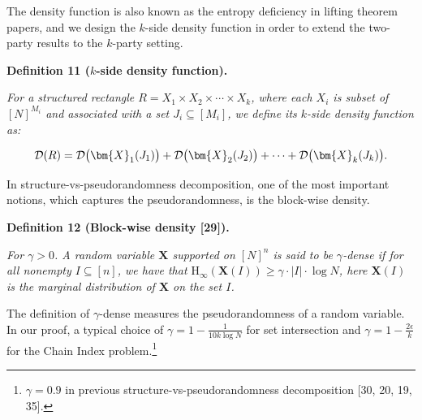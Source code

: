 The density function is also known as the entropy deficiency in lifting theorem papers, and we design the $k$-side density function in order to extend the two-party results to the $k$-party setting.\par





\par\medskip\noindent\textbf{
\textbf{Definition 11}\textbf{ }($k$-side density function)\textbf{.}
}\par



\emph{For a structured rectangle $R=X_{1}\times X_{2}\times\cdots\times X_{k}$, where each $X_{i}$ is subset of $[N]^{M_{i}}$ and associated with a set $J_{i}\subseteq[M_{i}]$, we define its $k$-side density function as:}\par


\[\begin{gathered}
\mathcal{D}(R)=\mathcal{D}\big{(}\bm{X}_{1}(J_{1})\big{)}+\mathcal{D}\big{(}\bm{X}_{2}(J_{2})\big{)}+\cdots+\mathcal{D}\big{(}\bm{X}_{k}(J_{k})\big{)}.
\end{gathered}\]






In structure-vs-pseudorandomness decomposition, one of the most important notions, which captures the pseudorandomness, is the block-wise density.\par





\par\medskip\noindent\textbf{
\textbf{Definition 12}\textbf{ }(Block-wise density [29])\textbf{.}
}\par



\emph{For $\gamma>0$. A random variable $\bm{X}$ supported on $[N]^{n}$ is said to be $\gamma$-dense if for all nonempty $I\subseteq[n]$, we have that $\text{H}_{\infty}(\bm{X}(I))\geq\gamma\cdot|I|\cdot\log N$, here $\bm{X}(I)$ is the marginal distribution of $\bm{X}$ on the set $I$.}\par






The definition of $\gamma$-dense measures the pseudorandomness of a random variable. In our proof, a typical choice of $\gamma=1-\frac{1}{10k\log N}$ for set intersection and $\gamma=1-\frac{2\epsilon}{k}$ for the Chain Index problem.\footnote{$\gamma=0.9$ in previous structure-vs-pseudorandomness decomposition [30, 20, 19, 35]. }\par





